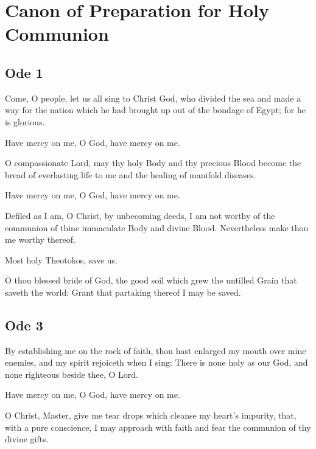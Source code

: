 \section{Canon of Preparation for Holy Communion}


\subsection{Ode 1}

 Come, O people, let us all sing to Christ God, who divided the sea and made a way for the nation which he had brought up out of the bondage of Egypt; for he is glorious.

\hspace{1em} Have mercy on me, O God, have mercy on me.

O compassionate Lord, may thy holy Body and thy precious Blood become the bread of everlasting life to me and the healing of manifold diseases.

\hspace{1em} Have mercy on me, O God, have mercy on me.

Defiled as I am, O Christ, by unbecoming deeds, I am not worthy of the communion of thine immaculate Body and divine Blood. Nevertheless make thou me worthy thereof.

\hspace{1em} Most holy Theotokos, save us.

O thou blessed bride of God, the good soil which grew the untilled Grain that saveth the world: Grant that partaking thereof I may be saved.

\subsection{Ode 3}

 By establishing me on the rock of faith, thou hast enlarged my mouth over mine enemies, and my spirit rejoiceth when I sing: There is none holy as our God, and none righteous beside thee, O Lord.

\hspace{1em} Have mercy on me, O God, have mercy on me.

O Christ, Master, give me tear drops which cleanse my heart's impurity, that, with a pure conscience, I may approach with faith and fear the communion of thy divine gifts.

